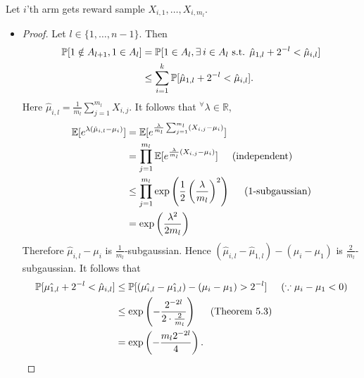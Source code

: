 \documentclass[10pt]{article}
\theoremstyle{definition}
\newenvironment{solution*}[1]{%
  \IfBlankTF{#1}
    {\renewcommand{\themanualsolutioninner}{\unskip}}
    {\renewcommand\themanualsolutioninner{#1}}%
  \manualsolutioninner
}{\endmanualsolutioninner}
\begin{document}
\begin{solution*}{}
    Let $i$'th arm gets reward sample $X_{i,1}, \ldots, X_{i,m_l}$.
    \begin{itemize}
        \item[(a)] 
        \begin{proof}
            Let $l \in \{1, \ldots, n-1\}$.
            Then
            \begin{align*}
                \mathbb{P}[1 \notin A_{l+1}, 1 \in A_l] &= \mathbb{P} [1 \in A_l, \exists \hspace{0.2em} i \in A_l \text{ s.t. } \hat{\mu}_{1,l} + 2^{-l} < \hat{\mu}_{i,l}] \\
                &\leq \sum_{i=1}^k \mathbb{P}[\hat{\mu}_{1,l}+ 2^{-l} < \hat{\mu}_{i,l}].
            \end{align*}
            Here $\hat{\mu}_{i,l} = \frac{1}{m_l}\sum_{j=1}^{m_l}X_{i,j}$. It follows that $^\forall \lambda \in \mathbb{R}$,
            \begin{align*}
                \mathbb{E}[e^{\lambda (\hat{\mu}_{i,l}-\mu_i)}] &= \mathbb{E}[e^{\frac{\lambda}{m_l}\sum_{j=1}^{m_l}(X_{i,j}-\mu_i)}] \\
                &= \prod_{j=1}^{m_l}\mathbb{E}[e^{\frac{\lambda}{m_l}(X_{i,j}-\mu_i)}] \hspace{0.5cm} (\text{independent}) \\
                &\leq \prod_{j=1}^{m_l} \exp\left(\frac{1}{2}\left(\frac{\lambda}{m_l}\right)^2\right) \hspace{0.5cm} (\text{1-subgaussian}) \\
                &= \exp \left(\frac{\lambda^2}{2m_l}\right)
            \end{align*}
            Therefore $\hat{\mu}_{i,l}-\mu_i$ is $\frac{1}{m_l}$-subgaussian.
            Hence $(\hat{\mu}_{i,l} - \hat{\mu}_{1,l}) - (\mu_i -\mu_1)$ is $\frac{2}{m_l}$-subgaussian.
            It follows that
            \begin{align*}
                \mathbb{P}[\hat{\mu_{1,l}}+2^{-l}<\hat{\mu}_{i,l}] &\leq \mathbb{P}[(\hat{\mu_{i,l}} - \hat{\mu_{1,l}})-(\mu_i - \mu_1) > 2^{-l}] \hspace{0.5cm} (\because \mu_i - \mu_1 < 0) \\
                &\leq \exp \left( - \frac{2^{-2l}}{2 \cdot \frac{2}{m_l}} \right) \hspace{0.5cm} \text{(Theorem 5.3)} \\
                &= \exp \left(-\frac{m_l 2^{-2l}}{4}\right).
            \end{align*}

\end{proof}
\end{itemize}
\end{solution*}
\end{document}

